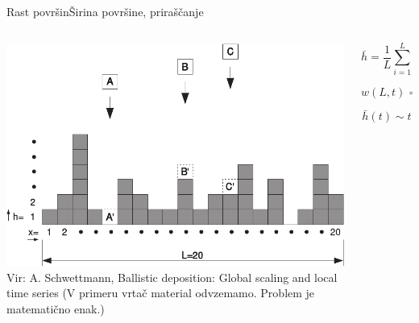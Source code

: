 \documentclass{beamer}
\begin{document}
\begin{frame}{Rast površin}{Širina površine, priraščanje}
\begin{columns}
  \begin{column}{0.45\textwidth}
     \hspace*{-0.05\textwidth}\includegraphics[width=1.1\textwidth]{slike/bdep2.pdf}
     \newline
     \newline
     \tiny{Vir: A. Schwettmann, Ballistic deposition: Global scaling and local time series}
     \newline \newline
     \tiny{(V primeru vrtač material odvzemamo. Problem je matematično enak.)}
  \end{column}

  \begin{column}{0.55\textwidth}
    \footnotesize
    \begin{equation} \bar{h} = \frac{1}{L} \sum_{i=1}^L h(i,t) \end{equation}
    \newline
    \begin{equation} w(L,t) = \sqrt{\frac{1}{L} \sum_{i=1}^L (h(i,t)-\bar{h}(t))^2} \end{equation}
    \newline
    \begin{equation} \bar{h}(t) \sim t \end{equation}
  \end{column}
\end{columns}
\end{frame}
\end{document}
